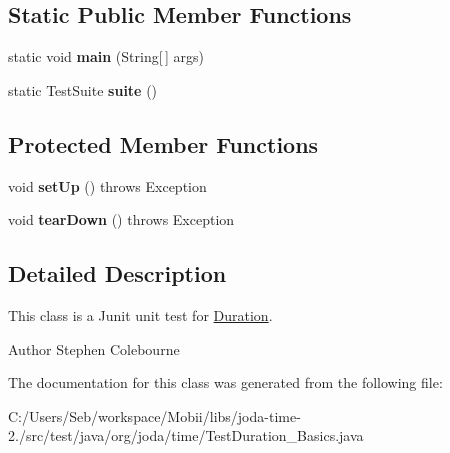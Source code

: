 \subsection*{Static Public Member Functions}
\begin{DoxyCompactItemize}
\item 
\hypertarget{classorg_1_1joda_1_1time_1_1_test_duration___basics_a2b3c51d10489520cc81ae3d42b4c9ed3}{static void {\bfseries main} (String\mbox{[}$\,$\mbox{]} args)}\label{classorg_1_1joda_1_1time_1_1_test_duration___basics_a2b3c51d10489520cc81ae3d42b4c9ed3}

\item 
\hypertarget{classorg_1_1joda_1_1time_1_1_test_duration___basics_a985d7f5d58d160bd6bb1672a8c92a999}{static Test\-Suite {\bfseries suite} ()}\label{classorg_1_1joda_1_1time_1_1_test_duration___basics_a985d7f5d58d160bd6bb1672a8c92a999}

\end{DoxyCompactItemize}
\subsection*{Protected Member Functions}
\begin{DoxyCompactItemize}
\item 
\hypertarget{classorg_1_1joda_1_1time_1_1_test_duration___basics_a6636e43fe99ab6b8ad4f9f92e465195e}{void {\bfseries set\-Up} ()  throws Exception }\label{classorg_1_1joda_1_1time_1_1_test_duration___basics_a6636e43fe99ab6b8ad4f9f92e465195e}

\item 
\hypertarget{classorg_1_1joda_1_1time_1_1_test_duration___basics_a8f7b86d1f597e2dde60458b0f7499945}{void {\bfseries tear\-Down} ()  throws Exception }\label{classorg_1_1joda_1_1time_1_1_test_duration___basics_a8f7b86d1f597e2dde60458b0f7499945}

\end{DoxyCompactItemize}


\subsection{Detailed Description}
This class is a Junit unit test for \hyperlink{classorg_1_1joda_1_1time_1_1_duration}{Duration}.

\begin{DoxyAuthor}{Author}
Stephen Colebourne 
\end{DoxyAuthor}


The documentation for this class was generated from the following file\-:\begin{DoxyCompactItemize}
\item 
C\-:/\-Users/\-Seb/workspace/\-Mobii/libs/joda-\/time-\/2./src/test/java/org/joda/time/Test\-Duration\-\_\-\-Basics.\-java\end{DoxyCompactItemize}
